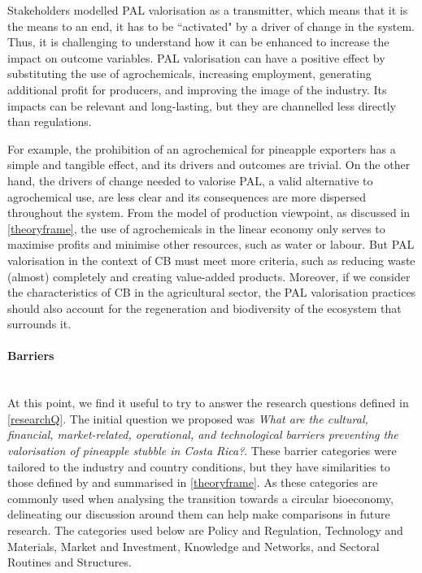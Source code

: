 Stakeholders modelled PAL valorisation as a transmitter, which means that it is the means to an end, it has to be ``activated" by a driver of change in the system. Thus, it is challenging to understand how it can be enhanced to increase the impact on outcome variables. PAL valorisation can have a positive effect by substituting the use of agrochemicals, increasing employment, generating additional profit for producers, and improving the image of the industry. Its impacts can be relevant and long-lasting, but they are channelled less directly than regulations. 

For example, the prohibition of an agrochemical for pineapple exporters has a simple and tangible effect, and its drivers and outcomes are trivial. On the other hand, the drivers of change needed to valorise PAL, a valid alternative to agrochemical use, are less clear and its consequences are more dispersed throughout the system. From the model of production viewpoint, as discussed in \cref{theoryframe}, the use of agrochemicals in the linear economy only serves to maximise profits and minimise other resources, such as water or labour. But PAL valorisation in the context of CB must meet more criteria, such as reducing waste (almost) completely and creating value-added products. Moreover, if we consider the characteristics of CB in the agricultural sector, the PAL valorisation practices should also account for the regeneration and biodiversity of the ecosystem that surrounds it. 

\paragraph{Barriers}\mbox{}\\
At this point, we find it useful to try to answer the research questions defined in \cref{researchQ}. The initial question we proposed was
\textit{What are the cultural, financial, market-related, operational, and technological barriers preventing the valorisation of pineapple stubble in Costa Rica?}. These barrier categories were tailored to the industry and country conditions, but they have similarities to those defined by \cite{gottinger2020studying} and summarised in \cref{theoryframe}. As these categories are commonly used when analysing the transition towards a circular bioeconomy, delineating our discussion around them can help make comparisons in future research. The categories used below are Policy and Regulation, Technology and Materials, Market and Investment, Knowledge and Networks, and Sectoral Routines and Structures. 

